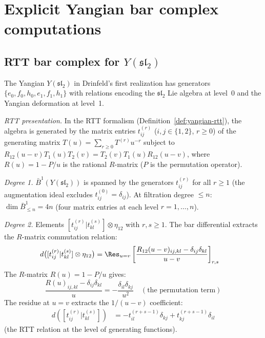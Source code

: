\section{Explicit Yangian bar complex computations}
\label{sec:yangian-bar-explicit}

\subsection{\texorpdfstring{RTT bar complex for $Y(\mathfrak{sl}_2)$}{RTT bar complex for Y(sl2)}}

\begin{computation}
\label{comp:yangian-sl2-bar}

The Yangian $Y(\mathfrak{sl}_2)$ in Drinfeld's first realization
has generators $\{e_0, f_0, h_0, e_1, f_1, h_1\}$ with
relations encoding the $\mathfrak{sl}_2$ Lie algebra at level~0
and the Yangian deformation at level~1.

\emph{RTT presentation.}
In the RTT formalism (Definition~\ref{def:yangian-rtt}), the
algebra is generated by the matrix entries $t_{ij}^{(r)}$
($i,j \in \{1,2\}$, $r \geq 0$) of the generating matrix
$T(u) = \sum_{r \geq 0} T^{(r)} u^{-r}$ subject to
$R_{12}(u-v) T_1(u) T_2(v) = T_2(v) T_1(u) R_{12}(u-v)$,
where $R(u) = 1 - P/u$ is the rational $R$-matrix
($P$ is the permutation operator).

\emph{Degree 1.}
$\bar{B}^1(Y(\mathfrak{sl}_2))$ is spanned by the
generators $t_{ij}^{(r)}$ for all $r \geq 1$
(the augmentation ideal excludes $t_{ij}^{(0)} = \delta_{ij}$).
At filtration degree $\leq n$: $\dim \bar{B}^1_{\leq n}
= 4n$ (four matrix entries at each level $r = 1, \ldots, n$).

\emph{Degree 2.}
Elements $[t_{ij}^{(r)} | t_{kl}^{(s)}] \otimes \eta_{12}$
with $r, s \geq 1$.  The bar differential extracts the $R$-matrix
commutation relation:
\begin{align}
d\bigl([t_{ij}^{(r)} | t_{kl}^{(s)}] \otimes \eta_{12}\bigr)
&= \Res_{u = v}\left[
\frac{R_{12}(u-v)_{ij,kl} - \delta_{ij}\delta_{kl}}{u-v}
\right]_{r,s} \label{eq:yangian-bar-d2}
\end{align}
The $R$-matrix $R(u) = 1 - P/u$ gives:
\[
\frac{R(u)_{ij,kl} - \delta_{ij}\delta_{kl}}{u}
= -\frac{\delta_{il}\delta_{kj}}{u^2}
\quad (\text{the permutation term})
\]
The residue at $u = v$ extracts the $1/(u-v)$ coefficient:
\begin{align}
d([t_{ij}^{(r)} | t_{kl}^{(s)}]) &=
-t_{il}^{(r+s-1)} \delta_{kj} + t_{kj}^{(r+s-1)} \delta_{il}
\label{eq:yangian-d2-explicit}
\end{align}
(the RTT relation at the level of generating functions).


\end{computation}
